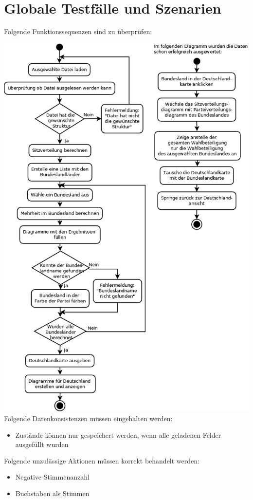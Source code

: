 \documentclass[10pt,a4paper]{article}
\begin{document}
\section{Globale Testfälle und Szenarien}
Folgende Funktionssequenzen sind zu überprüfen:

\includegraphics[scale=0.4]{Diagramm2}
\newpage
Folgende Datenkonsistenzen müssen eingehalten werden:
\begin{itemize}
	\item Zustände können nur gespeichert werden, wenn alle geladenen Felder ausgefüllt wurden
\end{itemize}
Folgende unzulässige Aktionen müssen korrekt behandelt werden:
\begin{itemize}
	\item Negative Stimmenanzahl
	\item Buchstaben als Stimmen
\end{itemize}
\end{document}
